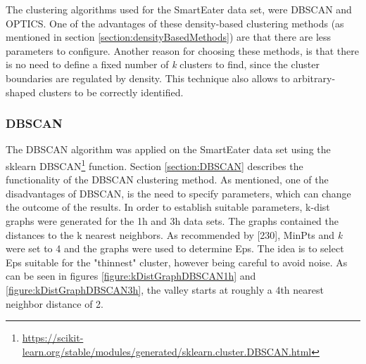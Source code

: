 The clustering algorithms used for the SmartEater data set, were DBSCAN and OPTICS. One of the advantages of these density-based clustering methods (as mentioned in section \ref{section:densityBasedMethods}) are that there are less parameters to configure. Another reason for choosing these methods, is that there is no need to define a fixed number of \textit{k} clusters to find, since the cluster boundaries are regulated by density. This technique also allows to arbitrary-shaped clusters to be correctly identified.

\subsubsection{DBSCAN}
The DBSCAN algorithm was applied on the SmartEater data set using the sklearn DBSCAN\footnote{\url{https://scikit-learn.org/stable/modules/generated/sklearn.cluster.DBSCAN.html}} function.
Section \ref{section:DBSCAN} describes the functionality of the DBSCAN clustering method. As mentioned, one of the disadvantages of DBSCAN, is the need to specify parameters, which can change the outcome of the results. In order to establish suitable parameters, k-dist graphs were generated for the 1h and 3h data sets. The graphs contained the distances to the k nearest neighbors. As recommended by \textcite{DBSCAN}[230], MinPts and \textit{k} were set to 4 and the graphs were used to determine Eps. The idea is to select Eps suitable for the "thinnest" cluster, however being careful to avoid noise. As can be seen in figures \ref{figure:kDistGraphDBSCAN1h} and \ref{figure:kDistGraphDBSCAN3h}, the valley starts at roughly a 4th nearest neighbor distance of 2. 




